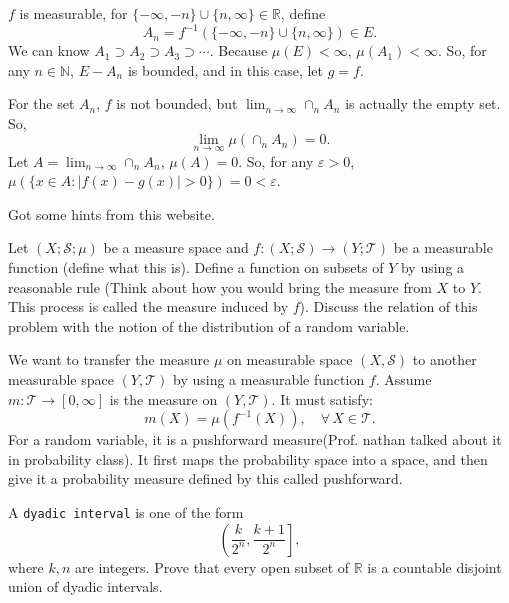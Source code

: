 \documentclass[12pt]{article}
\newenvironment{exercise}[1]{\begin{tcolorbox}[colback=black!15, colframe=black!80, breakable, title=#1]}{\end{tcolorbox}}
\newenvironment{proof}{\begin{tcolorbox}[colback=white, colframe=black!50, breakable, title=Proof. ]\setlength{\parskip}{0.8em}}{\,\\\rightline{$\square$}\end{tcolorbox}}
\newenvironment{solution}{\begin{tcolorbox}[colback=white, colframe=black!50, breakable, title=Solution. ]\setlength{\parskip}{0.8em}}{\end{tcolorbox}}
\begin{document}
    \begin{proof}
        $f$ is measurable, for $\{-\infty, -n\}\cup\{n,\infty\}\in\mathbb{R}$, define 
        \[A_n=f^{-1}(\{-\infty, -n\}\cup\{n,\infty\})\in E. \] 
        We can know $A_1\supset A_2\supset A_3\supset\cdots$. Because $\mu(E)<\infty$, $\mu(A_1)<\infty$. So, for any $n\in\mathbb{N}$, $E-A_n$ is bounded, and in this case, let $g=f$. 

        For the set $A_n$, $f$ is not bounded, but $\lim_{n\to\infty}\cap_nA_n$ is actually the empty set. So, \[\lim_{n\to\infty}\mu(\cap_nA_n)=0. \]
        Let $A=\lim_{n\to\infty}\cap_nA_n$, $\mu(A)=0$. So, for any $\varepsilon>0$, $\mu(\{x\in A:|f(x)-g(x)|>0\})=0<\varepsilon$. 

        Got some hints from this website. 
    \end{proof}

    \begin{exercise}{4}
        Let $(X; \mathscr{S}; \mu)$ be a measure space and $f : (X; \mathscr{S}) \to (Y; \mathscr{T} )$ be a measurable function (define what this is). Define a function on subsets of $Y$ by using a reasonable rule (Think about how you would bring the measure from $X$ to $Y$. This process is called the measure induced by $f$). Discuss the relation of this problem with the notion of the distribution of a random variable. 
    \end{exercise}

    \begin{solution}
        We want to transfer the measure $\mu$ on measurable space $(X,\mathscr{S})$ to another measurable space $(Y,\mathscr{T})$ by using a measurable function $f$. Assume $m: \mathscr{T}\to [0,\infty]$ is the measure on $(Y,\mathscr{T})$. It must satisfy: 
        \[m(X)=\mu(f^{-1}(X)),\quad \forall\, X\in\mathscr{T}. \]
        For a random variable, it is a pushforward measure(Prof. nathan talked about it in probability class). It first maps the probability space into a space, and then give it a probability measure defined by this called pushforward. 
    \end{solution}

    \begin{exercise}{5}
        A \texttt{dyadic interval} is one of the form
        \[\left(\frac{k}{2^n}, \frac{k+1}{2^n}\right], \]
        where $k, n$ are integers. Prove that every open subset of $\mathbb{R}$ is a countable disjoint union of dyadic intervals. 
    \end{exercise}
\end{document}
